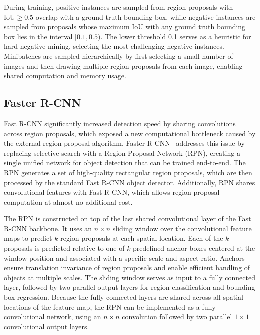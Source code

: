 During training, positive instances are sampled from region proposals with $\text{IoU} \ge 0.5$ overlap with a ground truth bounding box, while negative instances are sampled from proposals whose maximum IoU with any ground truth bounding box lies in the interval $[0.1, 0.5)$. The lower threshold 0.1 serves as a heuristic for hard negative mining, selecting the most challenging negative instances. Minibatches are sampled hierarchically by first selecting a small number of images and then drawing multiple region proposals from each image, enabling shared computation and memory usage.~\cite{Girshick2015}

\subsection{Faster R-CNN}
Fast R-CNN significantly increased detection speed by sharing convolutions across region proposals, which exposed a new computational bottleneck caused by the external region proposal algorithm. Faster R-CNN~\cite{Ren2015} addresses this issue by replacing selective search with a Region Proposal Network (RPN), creating a single unified network for object detection that can be trained end-to-end. The RPN generates a set of high-quality rectangular region proposals, which are then processed by the standard Fast R-CNN object detector. Additionally, RPN shares convolutional features with Fast R-CNN, which allows region proposal computation at almost no additional cost.

The RPN is constructed on top of the last shared convolutional layer of the Fast R-CNN backbone. It uses an $n \times n$ sliding window over the convolutional feature maps to predict $k$ region proposals at each spatial location. Each of the $k$ proposals is predicted relative to one of $k$ predefined anchor boxes centered at the window position and associated with a specific scale and aspect ratio. Anchors ensure translation invariance of region proposals and enable efficient handling of objects at multiple scales. The sliding window serves as input to a fully connected layer, followed by two parallel output layers for region classification and bounding box regression. Because the fully connected layers are shared across all spatial locations of the feature map, the RPN can be implemented as a fully convolutional network, using an $n \times n$ convolution followed by two parallel $1 \times 1$ convolutional output layers.


